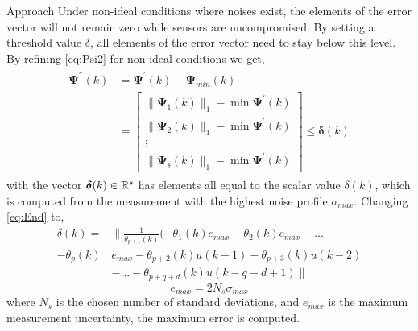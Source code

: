 \begin{section}{Approach}
Under non-ideal conditions where noises exist, the elements of the error vector will not remain zero while sensors are uncompromised. By setting a threshold value $\delta$, all elements of the error vector need to stay below this level. By refining \eqref{eq:Psi2} for non-ideal conditions we get,
    \begin{align}
    \begin{split}
    \label{eq:Psi2_nonideal}
	\bm{\Psi^{''}}(k)&=\bm{\Psi^{'}}(k)-\bm{\Psi}^{'}_{min}(k) \\
	& =\begin{bmatrix} \lVert{\bm{\Psi}_1(k)}\rVert_1 - \min \bm{\Psi}^{'}(k)\\ \lVert{\bm{\Psi}_2(k)}\rVert_1 - \min \bm{\Psi}^{'}(k) \\ \vdots \\ \lVert{\bm{\Psi}_s(k)}\rVert_1 - \min \bm{\Psi}^{'}(k) \end{bmatrix} \leq \bm{\delta}(k)
	\end{split}
	\end{align}
with the vector $\bm{\delta}(k) \in \mathbb{R}^s$ has elements all equal to the scalar value $\delta(k)$, which is computed from the measurement with the highest noise profile $\sigma_{max}$. Changing \eqref{eq:End} to,
\begin{align}
	\label{eq:delta}
	\delta(k)=& \lVert{ \frac{1}{\theta_{p+1}(k)}(-\theta_1(k)e_{max}-\theta_2(k)e_{max} }-\dots \nonumber \\
    -\theta_p(k)&e_{max}-\theta_{p+2}(k)u(k-1)-\theta_{p+3}(k)u(k-2)  \\
	&- \dots - \theta_{p+q+d}(k)u(k-q-d+1) \rVert  \nonumber
	\end{align}
	\begin{equation}
	    \label{eq:max_error}
	    e_{max} = 2N_s\sigma_{max}
	\end{equation}
where $N_s$ is the chosen number of standard deviations, and $e_{max}$ is the maximum measurement uncertainty, the maximum error is computed. 


\end{section}
